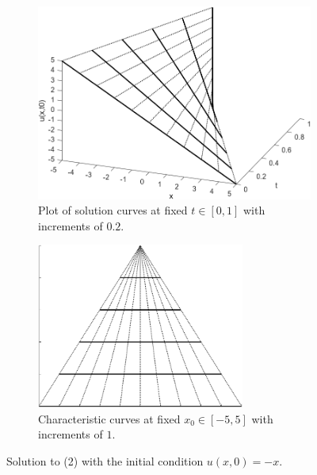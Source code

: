 \documentclass{myproject}
\begin{document}
\begin{figure}
    \centering
    \begin{subfigure}{.48\textwidth}
        \centering
        \includegraphics[width=1.0\textwidth]{intro_f2_3d.png}
        \caption{Plot of solution curves at fixed $t\in[0,1]$ with increments of $0.2$.}
        \label{fig:f2_3d}
    \end{subfigure}\hfill
    \begin{subfigure}{.48\textwidth}
        \centering
        \includegraphics[width=0.75\textwidth]{intro_f2_char.png}
        \caption{Characteristic curves at fixed $x_0 \in [-5, 5]$ with increments of $1$.}
        \label{fig:f2_char}
    \end{subfigure}
    \caption{Solution to (2) with the initial condition $u(x,0) = -x$.}
    \label{fig:f2}
\end{figure}

\pagebreak
\end{document}
